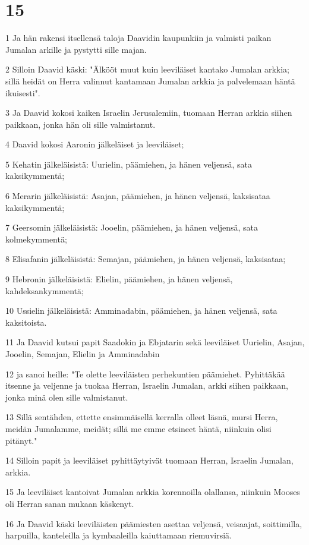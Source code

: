 \chapter{15}

\par 1 Ja hän rakensi itsellensä taloja Daavidin kaupunkiin ja valmisti paikan Jumalan arkille ja pystytti sille majan.
\par 2 Silloin Daavid käski: "Älkööt muut kuin leeviläiset kantako Jumalan arkkia; sillä heidät on Herra valinnut kantamaan Jumalan arkkia ja palvelemaan häntä ikuisesti".
\par 3 Ja Daavid kokosi kaiken Israelin Jerusalemiin, tuomaan Herran arkkia siihen paikkaan, jonka hän oli sille valmistanut.
\par 4 Daavid kokosi Aaronin jälkeläiset ja leeviläiset;
\par 5 Kehatin jälkeläisistä: Uurielin, päämiehen, ja hänen veljensä, sata kaksikymmentä;
\par 6 Merarin jälkeläisistä: Asajan, päämiehen, ja hänen veljensä, kaksisataa kaksikymmentä;
\par 7 Geersomin jälkeläisistä: Jooelin, päämiehen, ja hänen veljensä, sata kolmekymmentä;
\par 8 Elisafanin jälkeläisistä: Semajan, päämiehen, ja hänen veljensä, kaksisataa;
\par 9 Hebronin jälkeläisistä: Elielin, päämiehen, ja hänen veljensä, kahdeksankymmentä;
\par 10 Ussielin jälkeläisistä: Amminadabin, päämiehen, ja hänen veljensä, sata kaksitoista.
\par 11 Ja Daavid kutsui papit Saadokin ja Ebjatarin sekä leeviläiset Uurielin, Asajan, Jooelin, Semajan, Elielin ja Amminadabin
\par 12 ja sanoi heille: "Te olette leeviläisten perhekuntien päämiehet. Pyhittäkää itsenne ja veljenne ja tuokaa Herran, Israelin Jumalan, arkki siihen paikkaan, jonka minä olen sille valmistanut.
\par 13 Sillä sentähden, ettette ensimmäisellä kerralla olleet läsnä, mursi Herra, meidän Jumalamme, meidät; sillä me emme etsineet häntä, niinkuin olisi pitänyt."
\par 14 Silloin papit ja leeviläiset pyhittäytyivät tuomaan Herran, Israelin Jumalan, arkkia.
\par 15 Ja leeviläiset kantoivat Jumalan arkkia korennoilla olallansa, niinkuin Mooses oli Herran sanan mukaan käskenyt.
\par 16 Ja Daavid käski leeviläisten päämiesten asettaa veljensä, veisaajat, soittimilla, harpuilla, kanteleilla ja kymbaaleilla kaiuttamaan riemuvirsiä.
